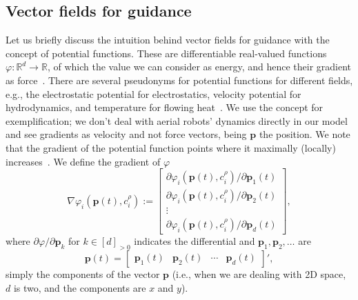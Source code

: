 \subsection{Vector fields for guidance}

Let us briefly discuss the intuition behind vector fields for guidance with the concept of potential functions. These are differentiable real-valued functions $\varphi:\mathbb{R}^d\rightarrow\mathbb{R}$, of which the value we can consider as energy, and hence their gradient as force~\citep{choset2005principles}. There are several pseudonyms for potential functions for different fields, e.g., the electrostatic potential for electrostatics, velocity potential for hydrodynamics, and temperature for flowing heat~\citep{needham1998visual}. We use the concept for exemplification; we don't deal with aerial robots' dynamics directly in our model and see gradients as velocity and not force vectors, being $\mathbf{p}$ the position. We note that the gradient of the potential function points where it maximally (locally) increases~\citep{choset2005principles}. We define the gradient of $\varphi$
\begin{equation}\label{eq:grady}
  \nabla\varphi_i(\mathbf{p}(t),c^\rho_i):=\begin{bmatrix}\partial\varphi_i(\mathbf{p}(t),c^\rho_i)/\partial\mathbf{p}_1(t)\\\partial\varphi_i(\mathbf{p}(t),c^\rho_i)/\partial\mathbf{p}_2(t)\\\vdots\\\partial\varphi_i(\mathbf{p}(t),c^\rho_i)/\partial\mathbf{p}_d(t)\end{bmatrix},
\end{equation}
where $\partial\varphi/\partial\mathbf{p}_k$ for $k\in[d]_{>0}$ indicates the differential and $\mathbf{p}_1,\mathbf{p}_2,\dots$ are 
\begin{equation}
  \mathbf{p}(t)=\begin{bmatrix}
    \mathbf{p}_1(t) & \mathbf{p}_2(t) & \cdots & \mathbf{p}_d(t)
  \end{bmatrix}',
\end{equation}
simply the components of the vector $\mathbf{p}$ (i.e., when we are dealing with 2D space, $d$ is two, and the components are $x$ and $y$). 

